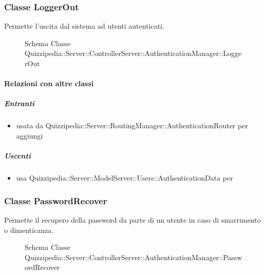 \subsubsection{Classe LoggerOut}
Permette l'uscita dal sistema ad utenti autenticati.
\begin{figure}[H]
\centering
\noindent{}
\caption[Schema Classe LoggerOut]{Schema Classe Quizzipedia::Server::ControllerServer::AuthenticationManager::LoggerOut}
\end{figure}
\paragraph{Relazioni con altre classi}
\subparagraph{Entranti}
\begin{itemize}
\item usata da Quizzipedia::Server::RoutingManager::AuthenticationRouter per aggiungi
\end{itemize}
\subparagraph{Uscenti}
\begin{itemize}
\item usa Quizzipedia::Server::ModelServer::Users::AuthenticationData per 
\end{itemize}
\subsubsection{Classe PasswordRecover}
Permette il recupero della password da parte di un utente in caso di smarrimento o dimenticanza.
\begin{figure}[H]
\centering
\noindent{}
\caption[Schema Classe PasswordRecover]{Schema Classe Quizzipedia::Server::ControllerServer::AuthenticationManager::PasswordRecover}
\end{figure}
